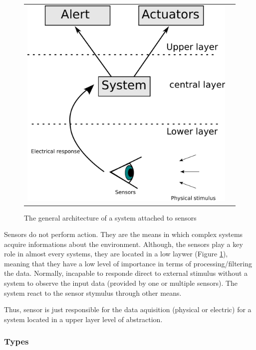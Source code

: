 \begin{figure}[h]
   \centering
     \begin{tabular}{lr}
       \includegraphics[scale=0.45]{img/fig:sensors:role}
     \end{tabular}
   \caption{The general architecture of a system attached to sensors}
   \label{fig:sensors:role}
 \end{figure}

Sensors do not perform action. They are the means in which complex systems acquire informations about the environment. Although, the sensors play a key role in almost every systems, they are located in a low laywer (Figure \ref{fig:sensors:role}), meaning that they have a low level of importance in terms of processing/filtering the data. Normally, incapable to responde direct to external stimulus without a system to observe the input data (provided by one or multiple sensors). The system react to the sensor stymulus through other means.

Thus, sensor is just responsible for the data aquisition (physical or electric) for a system located in a upper layer level of abstraction.

\subsubsection{Types}

